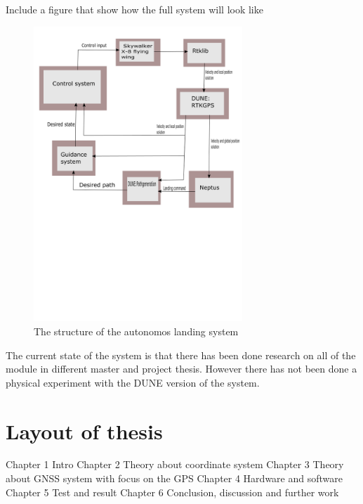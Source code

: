 Include a figure that show how the full system will look like

\begin{figure}[H]
	\centering
		\includegraphics[width=0.7\textwidth]{figs/SystemOverview.png}
		\caption{The structure of the autonomos landing system}
		\label{figure:SystemOverview}
\end{figure}

The current state of the system is that there has been done research on all of the module in different master and project thesis. However there has not been done a physical experiment with the DUNE version of the system.
\section{Layout of thesis}
Chapter 1 Intro
Chapter 2 Theory about coordinate system
Chapter 3 Theory about GNSS system with focus on the GPS
Chapter 4 Hardware and software
Chapter 5 Test and result
Chapter 6 Conclusion, discussion and further work


